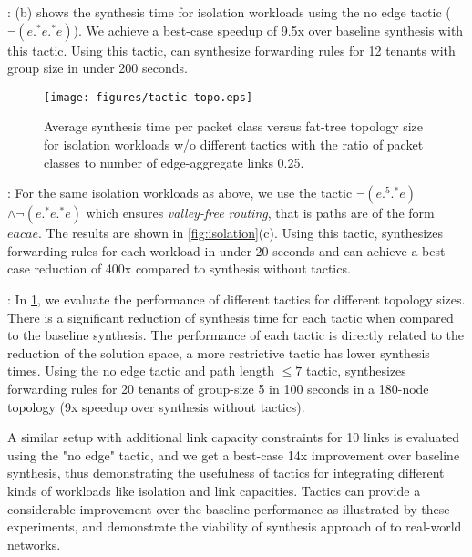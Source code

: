  : (b) shows the synthesis time for isolation workloads using the no edge tactic 
 ($\neg(e .^* e .^* e)$). We achieve a best-case speedup of 9.5x over baseline synthesis with this tactic. 
 Using this tactic, \Name can synthesize forwarding rules for 12 tenants with group size in under 200
 seconds.
 
 \begin{figure}[h]
 	\texttt{[image: figures/tactic-topo.eps]}
 	\caption{Average synthesis time per packet class versus fat-tree topology size for isolation workloads 
 		w/o different tactics with the ratio of packet classes to number of edge-aggregate links 0.25.}
 	\label{fig:tactic-topo}
 \end{figure}
 
:  
For the same isolation workloads as above, we use the tactic $\neg (e .^5 .^* e)$ $\wedge \neg (e .^* e .^* e)$
 which ensures {\em valley-free routing}, that is paths are of the form $eacae$. 
 The results are shown in \cref{fig:isolation}(c). 
 Using this tactic, \Name synthesizes forwarding rules for each workload in under 20 seconds 
 and can achieve a best-case reduction of 400x compared to synthesis without tactics. 
 
: 
In \cref{fig:tactic-topo},
 we evaluate the performance of different tactics for different topology sizes. There is a
 significant reduction of synthesis time for each tactic when compared to the baseline synthesis.
 The performance of each tactic is directly related to the reduction of the solution space, a more
 restrictive tactic has lower synthesis times. 
  Using the no edge tactic
 and path length $\leq 7$ tactic, \Name synthesizes forwarding rules for 20 tenants of group-size 5 in 100 seconds in a 180-node
 topology (9x speedup over synthesis without tactics).
  
 A similar setup with additional link capacity 
 constraints for 10 links is evaluated using the "no edge" tactic, and we get a best-case 14x
 improvement over baseline synthesis, thus demonstrating the usefulness of tactics for 
 integrating different kinds of workloads like isolation and link capacities. 
 Tactics can provide 
 a considerable improvement over the baseline performance as illustrated by these experiments,
 and demonstrate the viability of synthesis approach of \Name to real-world networks.  
 
